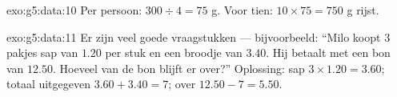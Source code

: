 \begin{solution}{exo:g5:data:10}
Per persoon: $300 \div 4 = 75$ g. Voor tien: $10 \times 75 = 750$ g rijst.
\end{solution}

\begin{solution}{exo:g5:data:11}
Er zijn veel goede vraagstukken --- bijvoorbeeld: ``Milo koopt $3$ pakjes sap
van $1.20$ per stuk en een broodje van $3.40$. Hij betaalt met een bon van
$12.50$. Hoeveel van de bon blijft er over?'' Oplossing: sap
$3 \times 1.20 = 3.60$; totaal uitgegeven $3.60 + 3.40 = 7$; over
$12.50 - 7 = 5.50$.
\end{solution}
